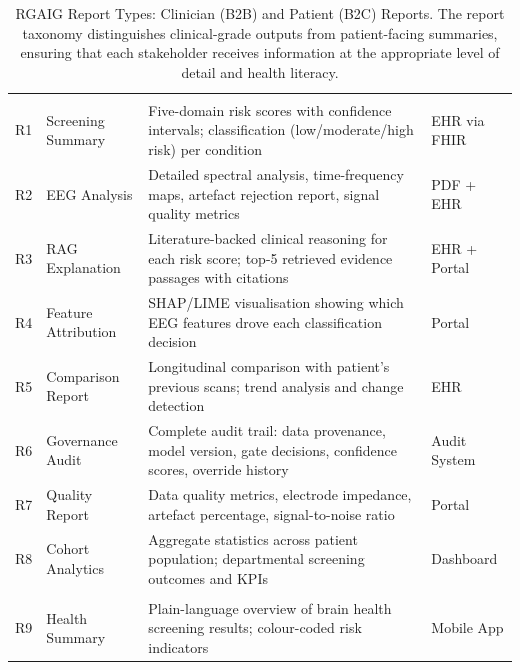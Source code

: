 {\tablestripes\tablefontsize
{}
\begin{xltabular}{\textwidth}{@{} >{\raggedright\arraybackslash}p{1.0cm} >{\raggedright\arraybackslash}p{3.4cm} p{8.3cm} >{\raggedright\arraybackslash}p{1.5cm} @{}}
\caption[RGAIG Report Types: Clinician (B2B) and Patient (B2C)]{RGAIG Report Types: Clinician (B2B) and Patient (B2C) Reports. The report taxonomy distinguishes clinical-grade outputs from patient-facing summaries, ensuring that each stakeholder receives information at the appropriate level of detail and health literacy.}\label{tab:report_types} \\
\toprule
\thead{\#} &  &  &  \\
\midrule
\endfirsthead
\endhead
\bottomrule
\endlastfoot
{} \\
\addlinespace
R1 & Screening Summary & Five-domain risk scores with confidence intervals; classification (low/moderate/high risk) per condition & EHR via FHIR \\
\addlinespace
R2 & EEG Analysis & Detailed spectral analysis, time-frequency maps, artefact rejection report, signal quality metrics & PDF + EHR \\
\addlinespace
R3 & RAG Explanation & Literature-backed clinical reasoning for each risk score; top-5 retrieved evidence passages with citations & EHR + Portal \\
\addlinespace
R4 & Feature Attribution & SHAP/LIME visualisation showing which EEG features drove each classification decision & Portal \\
\addlinespace
R5 & Comparison Report & Longitudinal comparison with patient's previous scans; trend analysis and change detection & EHR \\
\addlinespace
R6 & Governance Audit & Complete audit trail: data provenance, model version, gate decisions, confidence scores, override history & Audit System \\
\addlinespace
R7 & Quality Report & Data quality metrics, electrode impedance, artefact percentage, signal-to-noise ratio & Portal \\
\addlinespace
R8 & Cohort Analytics & Aggregate statistics across patient population; departmental screening outcomes and KPIs & Dashboard \\
\midrule
{} \\
\addlinespace
R9 & Health Summary & Plain-language overview of brain health screening results; colour-coded risk indicators & Mobile App \\

\end{xltabular}}
